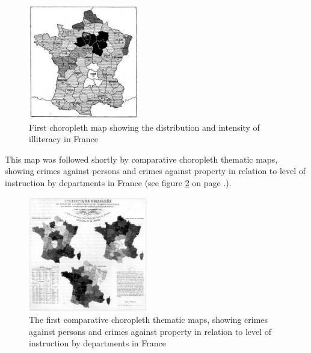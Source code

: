 \begin{figure}[!htb]
\centering
\includegraphics[height=5cm,keepaspectratio]{images/history/dupin.jpg}
\caption[
    First choropleth map showing the distribution and intensity of illiteracy in France, Urldate: 07.2016 \newline
\small\texttt{\url{http://datavis.ca/milestones//admin/uploads/images/dupin.gif}}
]{First choropleth map showing the distribution and intensity of illiteracy in France}
\label{fig:first-choropleth}
\end{figure}

This map was followed shortly by comparative choropleth thematic maps, showing crimes against persons and crimes against property in relation to level of instruction by departments in France (see figure \ref{fig:second-choropleth} on page \pageref{fig:second-choropleth}.).

\begin{figure}[!htb]
\centering
\includegraphics[height=5cm,keepaspectratio]{images/history/second-choropleth.jpg}
\caption[
    The first comparative choropleth thematic maps, showing crimes against persons and crimes against property in relation to level of instruction by departments in France, Urldate: 07.2016 \newline
\small\texttt{\url{http://datavis.ca/milestones//admin/uploads/images/guerry/guerry-balbi-600s.jpg}}
]{The first comparative choropleth thematic maps, showing crimes against persons and crimes against property in relation to level of instruction by departments in France}
\label{fig:second-choropleth}
\end{figure}

